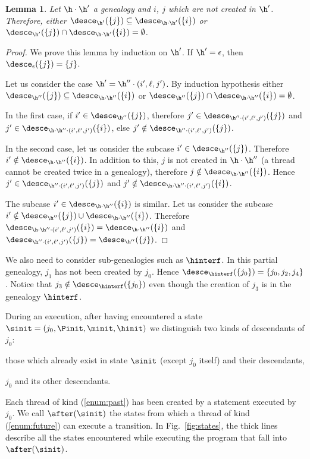 \documentclass[12pt]{article}
\let\vide\emptyset \let\appartient\in
\let\firstunion\cup
\let\firstinter\cap
\let\emptyset\vide \let\in\appartient
\let\cup\firstunion
\let\cap\firstinter
\renewcommand{\subset}{\subseteq}
\newtheorem{lemma}{Lemma}
\begin{document}
\begin{lemma}\label{lemma:Descendant}
 Let \(\h\cdot\h'\) a genealogy and \(i\), \(j\) which are not created in \(\h'\).
Therefore, either \(\desce_{\h'}(\{j\}) \subset \desce_{\h\cdot\h'}(\{i\}) \) or \(\desce_{\h'}(\{j\}) \cap \desce_{\h\cdot\h'}(\{i\}) = \emptyset\).
 \end{lemma}
\begin{proof}
 We prove this lemma by induction on \(\h'\).
 If \(\h'=\epsilon\), then \(\desce_{\epsilon}(\{j\}) = \{j\} \).
 
 Let us consider the case \(\h'=\h''\cdot(i',\ell,j')\).
 By induction hypothesis  either \(\desce_{\h''}(\{j\}) \subset \desce_{\h\cdot\h''}(\{i\}) \) or \(\desce_{\h''}(\{j\}) \cap \desce_{\h\cdot\h''}(\{i\}) = \emptyset\).
 
 In the first case, if \(i'\in \desce_{\h''}(\{j\})\), therefore \(j'\in \desce_{\h''\cdot(i',\ell',j')}(\{j\})\) and \(j'\in \desce_{\h\cdot\h''\cdot(i',\ell',j')}(\{i\})\), else \(j'\notin \desce_{\h''\cdot(i',\ell',j')}(\{j\})\).
 
 In the second case, let us consider the subcase \(i'\in \desce_{\h''}(\{j\})\). Therefore \(i'\notin \desce_{\h\cdot\h''}(\{i\})\). In addition to this, \(j\) is not created in \(\h\cdot\h''\) (a thread cannot be created twice in a genealogy), therefore \(j\notin \desce_{\h\cdot\h''}(\{i\})\).
 Hence \(j'\in \desce_{\h''\cdot(i',\ell',j')}(\{j\})\) and \(j'\notin \desce_{\h\cdot\h''\cdot(i',\ell',j')}(\{i\})\).
 
 The subcase \(i'\in \desce_{\h\cdot\h''}(\{i\})\) is similar. Let us consider the subcase \(i'\notin\desce_{\h''}(\{j\})\cup \desce_{\h\cdot\h''}(\{i\})\).
 Therefore \(\desce_{\h\cdot\h''\cdot(i',\ell',j')}(\{i\}) = \desce_{\h\cdot\h''}(\{i\})  \) and \(\desce_{\h''\cdot(i',\ell',j')}(\{j\}) = \desce_{\h''}(\{j\})\).
\end{proof}



 We also need to consider sub-genealogies such as \(\hinterf\). In this partial genealogy, \(j_1\) has not been created by \(j_0\). Hence \(\desce_{\hinterf}(\{j_0\})=\{j_0,j_2,j_4\}\). Notice that \(j_3\notin \desce_{\hinterf}(\{j_0\})\) even though the creation of \(j_3\) is in the genealogy \(\hinterf\).

During an execution, after having encountered a state \(\sinit=(j_0,\Pinit,\minit,\hinit)\) we distinguish two kinds of descendants of \(j_0\):
\begin{inparaenum}[(i)]
 \item \label{enum:past}those which already exist in state \(\sinit\) (except \(j_0\) itself) and their descendants,
 \item \label{enum:future}\(j_0\) and its other descendants.
\end{inparaenum}
Each thread of kind (\ref{enum:past}) has been created by a statement executed by \(j_0\).
We call \(\after(\sinit)\) the states from which a thread of kind (\ref{enum:future}) can execute a transition.
In Fig.~\ref{fig:states}, the thick lines describe all the states encountered while executing the program that fall into \(\after(\sinit)\).
\end{document}
